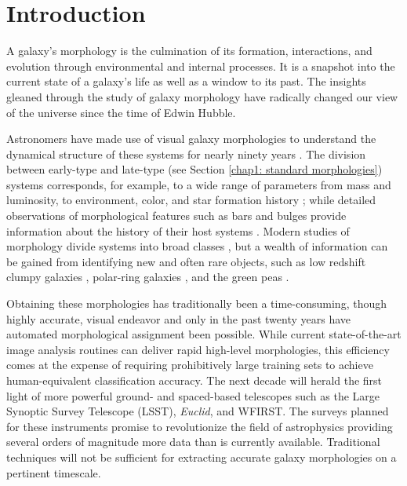 
\chapter{Introduction}
\label{chap:intro}


A galaxy's morphology is the culmination of its formation, interactions, and evolution through environmental and internal processes. It is a snapshot into the current state of a galaxy's life as well as a window to its past. The insights gleaned through the study of galaxy morphology have radically changed our view of the universe since the time of Edwin Hubble. 


Astronomers have made use of visual galaxy morphologies to understand the dynamical structure of these systems for nearly ninety years 
\citep[e.g.,][]{Hubble1936, 
			deVaucouleurs1959,
			Sandage1961, 
			vandenBergh1976, 
			NairAbraham2010, 
			Baillard2011}. 
The division between early-type and late-type (see Section \ref{chap1: standard morphologies}) systems corresponds, for example, to a wide range of parameters from mass and luminosity, to environment, color, and star formation history 
\citep[e.g.,][]{Kormendy1977,  
			Dressler1980, 
			Strateva2001, 
			Blanton2003a, 
			Kauffman2003, 
			Nakamura2003, 
			Shen2003, 
			Peng2010}; 
while detailed observations of morphological features such as bars and bulges provide information about the history of {}their host systems 
\citep[e.g.,][]{KK04, 
			Elmegreen2008, 
			Sheth2008, 
			Masters2010, 
			Simmons2014}. 
Modern studies of morphology  divide systems into broad classes 
\citep[e.g.,][]{Conselice2006, 
			Lintott2008, 
			Kartaltepe2015, 
			Peth2016}, 
but a wealth of information can be gained from identifying new and often rare objects, such as low redshift clumpy galaxies \citep[e.g.,][]{Elmegreen2013}, polar-ring galaxies \citep[e.g.,][]{Whitmore1990}, and the green peas \citep{Cardamone2009}. 

Obtaining these morphologies has traditionally been a time-consuming, though highly accurate, visual endeavor and only in the past twenty years have automated morphological assignment been possible. While current state-of-the-art image analysis routines can deliver rapid high-level morphologies, this efficiency comes at the expense of requiring prohibitively large training sets to achieve human-equivalent classification accuracy.  The next decade will herald the first light of more powerful ground- and spaced-based telescopes such as the Large Synoptic Survey Telescope (LSST), \textit{Euclid}, and WFIRST. The surveys planned for these instruments promise to revolutionize the field of astrophysics providing several orders of magnitude more data than is currently available. Traditional techniques will not be sufficient for extracting accurate galaxy morphologies on a pertinent timescale. 

